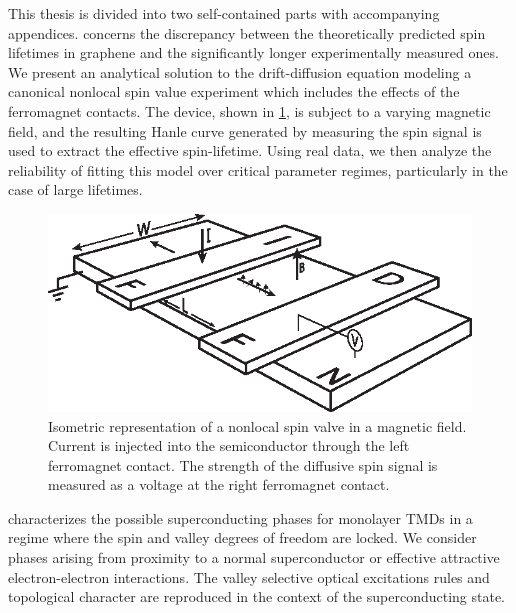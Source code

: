 This thesis is divided into two self-contained parts
with accompanying appendices.
concerns the discrepancy
between the theoretically predicted spin lifetimes in graphene
and the significantly longer experimentally measured ones.
We present an analytical solution to the drift-diffusion equation
modeling a canonical nonlocal spin value experiment which
includes the effects of the ferromagnet contacts.
The device, shown in \cref{fig:spin-device},
is subject to a varying magnetic field,
and the resulting Hanle curve generated by measuring the spin signal
is used to extract the effective spin-lifetime.
Using real data, we then analyze the reliability of fitting this model
over critical parameter regimes, particularly in the case of large lifetimes.

\begin{figure}[b]
  \centering
  \includegraphics[width=\textwidth]{figures/device}
  \caption{%
    Isometric representation of a nonlocal spin valve in a magnetic field.
    Current is injected into the semiconductor
    through the left ferromagnet contact.
    The strength of the diffusive spin signal is measured as a voltage
    at the right ferromagnet contact.
  }\label{fig:spin-device}
\end{figure}

characterizes the possible superconducting phases for monolayer TMDs
in a regime where the spin and valley degrees of freedom are locked.
We consider phases arising from proximity to a normal superconductor
or effective attractive electron-electron interactions.
The valley selective optical excitations rules
and topological character are reproduced
in the context of the superconducting state.

